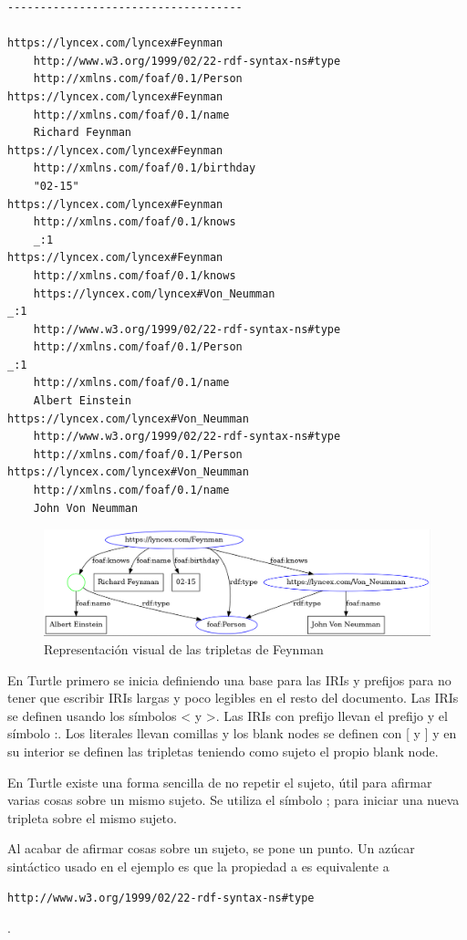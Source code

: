 \documentclass[12pt]{report} %
\begin{document}
\begin{lstlisting}[float,floatplacement=H]
------------------------------------

https://lyncex.com/lyncex#Feynman
    http://www.w3.org/1999/02/22-rdf-syntax-ns#type
    http://xmlns.com/foaf/0.1/Person
https://lyncex.com/lyncex#Feynman
    http://xmlns.com/foaf/0.1/name
    Richard Feynman
https://lyncex.com/lyncex#Feynman
    http://xmlns.com/foaf/0.1/birthday
    "02-15"
https://lyncex.com/lyncex#Feynman
    http://xmlns.com/foaf/0.1/knows
    _:1
https://lyncex.com/lyncex#Feynman
    http://xmlns.com/foaf/0.1/knows
    https://lyncex.com/lyncex#Von_Neumman
_:1
    http://www.w3.org/1999/02/22-rdf-syntax-ns#type
    http://xmlns.com/foaf/0.1/Person
_:1
    http://xmlns.com/foaf/0.1/name
    Albert Einstein
https://lyncex.com/lyncex#Von_Neumman
    http://www.w3.org/1999/02/22-rdf-syntax-ns#type
    http://xmlns.com/foaf/0.1/Person
https://lyncex.com/lyncex#Von_Neumman
    http://xmlns.com/foaf/0.1/name
    John Von Neumman
\end{lstlisting}

\begin{figure}
    \centering
    \includegraphics[width=\textwidth]{feynman.png}
    \caption{Representación visual de las tripletas de Feynman}
    \label{fig:feynman}
\end{figure}

En Turtle primero se inicia definiendo una base para las IRIs y prefijos para no tener que escribir IRIs largas y poco legibles en el resto del documento.
Las IRIs se definen usando los símbolos < y >. Las IRIs con prefijo llevan el prefijo y el símbolo :. 
Los literales llevan comillas y los blank nodes se definen con [ y ] y en su interior se definen las tripletas teniendo como sujeto el propio blank node.

En Turtle existe una forma sencilla de no repetir el sujeto, útil para afirmar varias cosas sobre un mismo sujeto. Se utiliza el símbolo ; para iniciar una nueva tripleta sobre el mismo sujeto.

Al acabar de afirmar cosas sobre un sujeto, se pone un punto. Un azúcar sintáctico usado en el ejemplo es que la propiedad a es equivalente a \begin{verbatim}http://www.w3.org/1999/02/22-rdf-syntax-ns#type\end{verbatim}.
\end{document}
